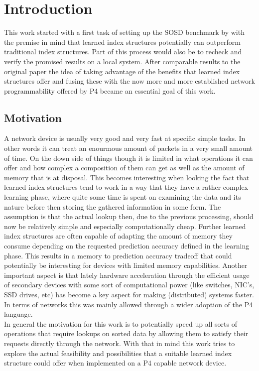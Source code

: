 
\chapter{Introduction}
\label{ch:introduction}
This work started with a first task of setting up the SOSD benchmark by \cite{sosd-neurips} with the premise in mind that learned index structures potentially can outperform traditional index structures. Part of this process would also be to recheck and verify the promised results on a local system. After comparable results to the original \cite{sosd-neurips} paper the idea of taking advantage of the benefits that learned index structures offer and fusing these with the now more and more established network programmability offered by P4 became an essential goal of this work.

\section{Motivation}
A network device is usually very good and very fast at specific simple tasks. In other words it can treat an enourmous amount of packets in a very small amount of time. On the down side of things though it is limited in what operations it can offer and how complex a composition of them can get as well as the amount of memory that is at disposal. This becomes interesting when looking the fact that learned index structures tend to work in a way that they have a rather complex learning phase, where quite some time is spent on examining the data and its nature before then storing the gathered information in some form. The assumption is that the actual lookup then, due to the previous processing, should now be relatively simple and especially computationally cheap. Further learned index structures are often capable of adapting the amount of memory they consume depending on the requested prediction accuracy defined in the learning phase. This results in a memory to prediction accuracy tradeoff that could potentially be interesting for devices with limited memory capabilities. Another important aspect is that lately hardware acceleration through the efficient usage of secondary devices with some sort of computational power (like switches, NIC's, SSD drives, etc) has become a key aspect for making (distributed) systems faster. In terms of networks this was mainly allowed through a wider adoption of the P4 language.\\

In general the motivation for this work is to potentially speed up all sorts of operations that require lookups on sorted data by allowing them to satisfy their requests directly through the network. With that in mind this work tries to explore the actual feasibility and possibilities that a suitable learned index structure could offer when implemented on a P4 capable network device.\pagebreak

